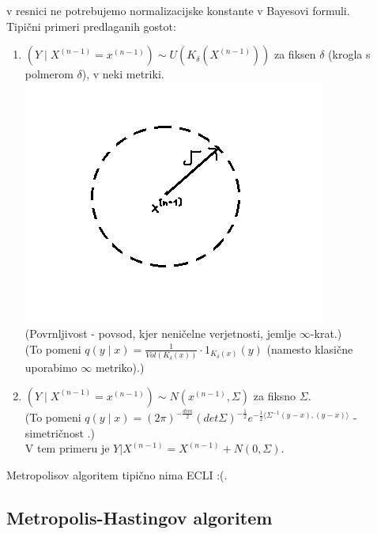 \documentclass[a4paper, 12pt]{book}
\theoremstyle{definition}
\theoremstyle{remark}
\begin{document}
v resnici ne potrebujemo normalizacijske konstante v Bayesovi formuli. \\
Tipični primeri predlaganih gostot:
\begin{enumerate}
  \item $(Y \mid X^{(n-1)} = x^{(n-1)}) \sim U\left(K_{\delta}(X^{(n-1)})\right)$ za fiksen $\delta$ (krogla s polmerom $\delta$),
    v neki metriki. \\
    \includegraphics[scale=0.5]{krogla_3_4_1} \\
    (Povrnljivost - povsod, kjer neničelne verjetnosti, jemlje $\infty$-krat.) \\
    (To pomeni $q(y \mid x) = \frac{1}{Vol(K_{\delta}(x))} \cdot 1_{K_{\delta}(x)} (y)$ (namesto klasične uporabimo $\infty$ metriko).)
  \item $(Y \mid X^{(n-1)} = x^{(n-1)}) \sim N\left(x^{(n-1)}, \Sigma\right)$ za fiksno $\Sigma$. \\
    (To pomeni $q(y \mid x) = (2 \pi)^{-\frac{dim}{2}} (det \Sigma)^{-\frac{1}{2}} e^{-\frac{1}{2} \langle \Sigma^{-1}(y-x), (y-x)\rangle}$
      - simetričnost \checkmark.) \\
    V tem primeru je $Y|X^{(n-1)} = X^{(n-1)} + N(0, \Sigma)$.
\end{enumerate}
Metropolisov algoritem tipično nima ECLI :(.

\subsection{Metropolis-Hastingov algoritem}
\end{document}
